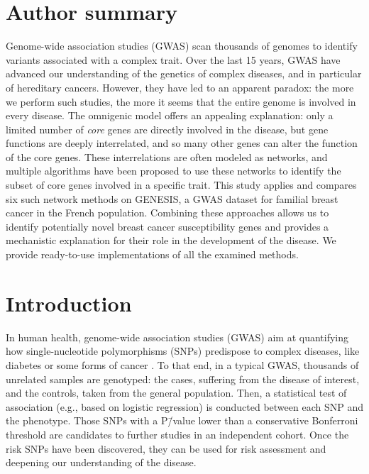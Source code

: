 \documentclass[10pt,letterpaper]{article}
\begin{document}
\section*{Author summary}
Genome-wide association studies (GWAS) scan thousands of genomes to identify variants associated with a complex trait. Over the last 15 years, GWAS have advanced our understanding of the genetics of complex diseases, and in particular of hereditary cancers. However, they have led to an apparent paradox: the more we perform such studies, the more it seems that the entire genome is involved in every disease. The omnigenic model offers an appealing explanation: only a limited number of \emph{core} genes are directly involved in the disease, but gene functions are deeply interrelated, and so many other genes can alter the function of the core genes. These interrelations are often modeled as networks, and multiple algorithms have been proposed to use these networks to identify the subset of core genes involved in a specific trait. This study applies and compares six such network methods on GENESIS, a GWAS dataset for familial breast cancer in the French population. Combining these approaches allows us to identify potentially novel breast cancer susceptibility genes and provides a mechanistic explanation for their role in the development of the disease. We provide ready-to-use implementations of all the examined methods.
\linenumbers

\section{Introduction}

In human health, genome-wide association studies (GWAS) aim at quantifying how single-nucleotide polymorphisms (SNPs) predispose to complex diseases, like diabetes or some forms of cancer \cite{bush_chapter_2012}. To that end, in a typical GWAS, thousands of unrelated samples are genotyped: the cases, suffering from the disease of interest, and the controls, taken from the general population. Then, a statistical test of association (e.g., based on logistic regression) is conducted between each SNP and the phenotype. Those SNPs with a P\=/value lower than a conservative Bonferroni threshold are candidates to further studies in an independent cohort. Once the risk SNPs have been discovered, they can be used for risk assessment and deepening our understanding of the disease.
\end{document}
